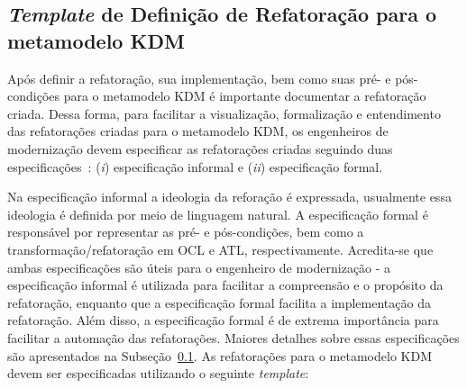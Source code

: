 \subsection{\textit{Template} de Definição de Refatoração para o metamodelo KDM}\label{sec:template_refatoracao}

Após definir a refatoração, sua implementação, bem como suas pré- e pós-condições para o metamodelo KDM é importante documentar a refatoração criada. Dessa forma, para facilitar a visualização, formalização e entendimento das refatorações criadas para o metamodelo KDM, os engenheiros de modernização devem especificar as refatorações criadas seguindo duas especificações~\cite{staron2004implementing}: (\textit{i}) especificação informal e (\textit{ii}) especificação formal. 

Na especificação informal a ideologia da reforação é expressada, usualmente essa ideologia é definida por meio de linguagem natural. A especificação formal é responsável por representar as pré- e pós-condições, bem como a transformação/refatoração em OCL e ATL, respectivamente. Acredita-se que ambas especificações são úteis para o engenheiro de modernização - a especificação informal é utilizada para facilitar a compreensão e o propósito da refatoração, enquanto que a especificação formal facilita a implementação da refatoração. Além disso, a especificação formal é de extrema importância para facilitar a automação das refatorações. Maiores detalhes sobre essas especificações são apresentados na Subseção~\ref{sec:template_refatoracao}.
%
%
%
%
As refatorações para o metamodelo KDM devem ser especificadas utilizando o seguinte \textit{template}:

